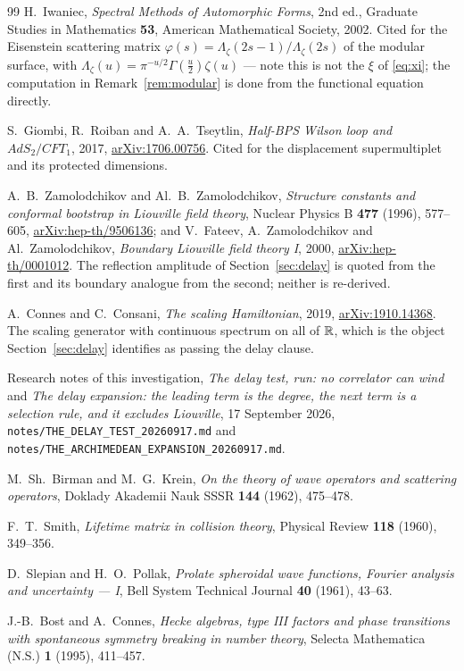 \begin{thebibliography}{99}
H.~Iwaniec, \emph{Spectral Methods of Automorphic Forms}, 2nd ed., Graduate
Studies in Mathematics \textbf{53}, American Mathematical Society, 2002. Cited for
the Eisenstein scattering matrix
$\varphi(s)=\Lambda_\zeta(2s-1)/\Lambda_\zeta(2s)$ of the modular surface, with
$\Lambda_\zeta(u)=\pi^{-u/2}\Gamma(\frac u2)\zeta(u)$ --- note this is not the
$\xi$ of \eqref{eq:xi}; the computation in Remark~\ref{rem:modular} is done from
the functional equation directly.

S.~Giombi, R.~Roiban and A.~A.~Tseytlin, \emph{Half-BPS Wilson loop and
$AdS_2/CFT_1$}, 2017, \href{https://arxiv.org/abs/1706.00756}{arXiv:1706.00756}.
Cited for the displacement supermultiplet and its protected dimensions.

A.~B.~Zamolodchikov and Al.~B.~Zamolodchikov, \emph{Structure constants and
conformal bootstrap in Liouville field theory}, Nuclear Physics B \textbf{477}
(1996), 577--605,
\href{https://arxiv.org/abs/hep-th/9506136}{arXiv:hep-th/9506136}; and
V.~Fateev, A.~Zamolodchikov and Al.~Zamolodchikov, \emph{Boundary Liouville field
theory I}, 2000, \href{https://arxiv.org/abs/hep-th/0001012}{arXiv:hep-th/0001012}.
The reflection amplitude of Section~\ref{sec:delay} is quoted from the first and
its boundary analogue from the second; neither is re-derived.

A.~Connes and C.~Consani, \emph{The scaling Hamiltonian}, 2019,
\href{https://arxiv.org/abs/1910.14368}{arXiv:1910.14368}. The scaling generator
with continuous spectrum on all of $\mathbb R$, which is the object
Section~\ref{sec:delay} identifies as passing the delay clause.

Research notes of this investigation, \emph{The delay test, run: no correlator can
wind} and \emph{The delay expansion: the leading term is the degree, the next term
is a selection rule, and it excludes Liouville}, 17 September 2026,
\texttt{notes/THE\_DELAY\_TEST\_20260917.md} and
\texttt{notes/THE\_ARCHIMEDEAN\_EXPANSION\_20260917.md}.

M.~Sh.~Birman and M.~G.~Krein, \emph{On the theory of wave operators and
scattering operators}, Doklady Akademii Nauk SSSR \textbf{144} (1962), 475--478.

F.~T.~Smith, \emph{Lifetime matrix in collision theory}, Physical Review
\textbf{118} (1960), 349--356.

D.~Slepian and H.~O.~Pollak, \emph{Prolate spheroidal wave functions, Fourier
analysis and uncertainty --- I}, Bell System Technical Journal \textbf{40}
(1961), 43--63.

J.-B.~Bost and A.~Connes, \emph{Hecke algebras, type III factors and phase
transitions with spontaneous symmetry breaking in number theory}, Selecta
Mathematica (N.S.) \textbf{1} (1995), 411--457.
\end{thebibliography}
